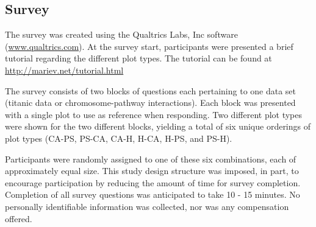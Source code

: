 
% 




\subsection*{Survey }\label{app2}
The survey was created using the  Qualtrics Labs, Inc software (\url{www.qualtrics.com}). 
At the survey start, participants were presented a brief tutorial regarding the different plot types. The tutorial can be found at \url{http://mariev.net/tutorial.html}

The survey consists of two blocks of questions each pertaining to one data set (titanic data or chromosome-pathway interactions). Each block was presented with a single plot  to use as reference when responding. Two different plot types were shown for the two different blocks, yielding a total of six unique orderings of plot types (CA-PS, PS-CA, CA-H, H-CA, H-PS, and PS-H). 

Participants were randomly assigned to one of these six combinations, each of approximately equal size.  This study design structure was imposed, in part,  to encourage participation by reducing the amount of time for survey completion. Completion of all survey questions was anticipated to take 10 - 15 minutes.
No personally identifiable information was collected, nor was any compensation offered.   

